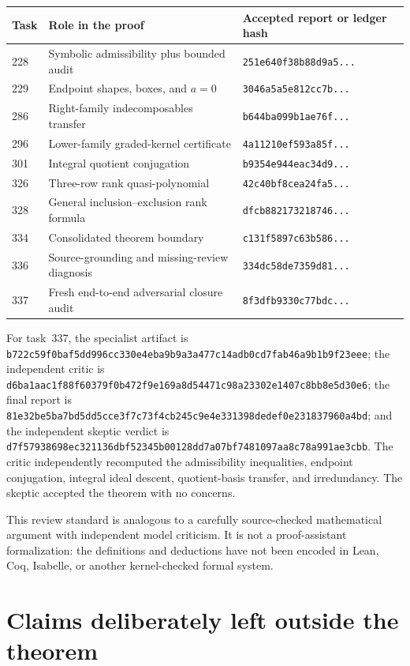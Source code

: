 \documentclass[11pt]{amsart}
\theoremstyle{definition}
\theoremstyle{remark}
\begin{document}
\begin{center}
\small
\begin{tabular}{@{}lll@{}}
\toprule
Task & Role in the proof & Accepted report or ledger hash\\
\midrule
228 & Symbolic admissibility plus bounded audit
  & \texttt{251e640f38b88d9a5...}\\
229 & Endpoint shapes, boxes, and $a=0$
  & \texttt{3046a5a5e812cc7b...}\\
286 & Right-family indecomposables transfer
  & \texttt{b644ba099b1ae76f...}\\
296 & Lower-family graded-kernel certificate
  & \texttt{4a11210ef593a85f...}\\
301 & Integral quotient conjugation
  & \texttt{b9354e944eac34d9...}\\
326 & Three-row rank quasi-polynomial
  & \texttt{42c40bf8cea24fa5...}\\
328 & General inclusion--exclusion rank formula
  & \texttt{dfcb882173218746...}\\
334 & Consolidated theorem boundary
  & \texttt{c131f5897c63b586...}\\
336 & Source-grounding and missing-review diagnosis
  & \texttt{334dc58de7359d81...}\\
337 & Fresh end-to-end adversarial closure audit
  & \texttt{8f3dfb9330c77bdc...}\\
\bottomrule
\end{tabular}
\end{center}

For task~337, the specialist artifact is
\texttt{b722c59f0baf5dd996cc330e4eba9b9a3a477c14adb0cd7fab46a9b1b9f23eee};
the independent critic is
\texttt{d6ba1aac1f88f60379f0b472f9e169a8d54471c98a23302e1407c8bb8e5d30e6};
the final report is
\texttt{81e32be5ba7bd5dd5cce3f7c73f4cb245c9e4e331398dedef0e231837960a4bd};
and the independent skeptic verdict is
\texttt{d7f57938698ec321136dbf52345b00128dd7a07bf7481097aa8c78a991ae3cbb}.
The critic independently recomputed the admissibility inequalities, endpoint
conjugation, integral ideal descent, quotient-basis transfer, and
irredundancy.  The skeptic accepted the theorem with no concerns.

This review standard is analogous to a carefully source-checked mathematical
argument with independent model criticism.  It is not a proof-assistant
formalization: the definitions and deductions have not been encoded in Lean,
Coq, Isabelle, or another kernel-checked formal system.

\section{Claims deliberately left outside the theorem}
\end{document}
